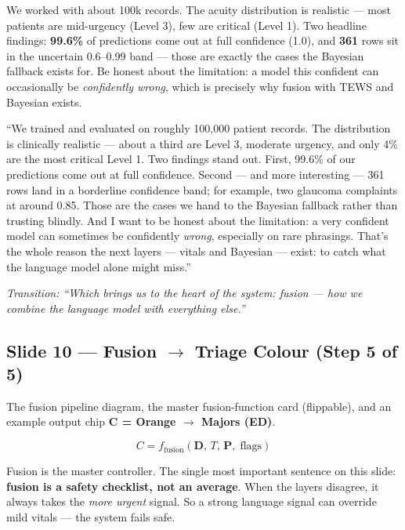 \documentclass[11pt]{article}
\newcommand{\chip}[2]{\textcolor{#1}{\textbf{#2}}}
\newcommand{\transition}[1]{\medskip\noindent\textit{\textcolor{mutel}{Transition: #1}}\medskip}
\newcommand{\route}[1]{{\small\texttt{\textcolor{mutel}{#1}}}}
\newcommand{\slide}[3]{%
  \subsection{Slide #1 --- #2}%
  \noindent\route{Route: #3}\par\smallskip}
\begin{document}
\begin{idea}
We worked with about 100k records. The acuity distribution is realistic --- most patients are
mid-urgency (Level 3), few are critical (Level 1). Two headline findings: \textbf{99.6\%} of predictions
come out at full confidence (1.0), and \textbf{361} rows sit in the uncertain 0.6--0.99 band --- those are
exactly the cases the Bayesian fallback exists for. Be honest about the limitation: a model this confident
can occasionally be \emph{confidently wrong}, which is precisely why fusion with TEWS and Bayesian exists.
\end{idea}

\begin{saybox}
``We trained and evaluated on roughly 100,000 patient records. The distribution is clinically realistic
--- about a third are Level 3, moderate urgency, and only 4\% are the most critical Level 1. Two findings
stand out. First, 99.6\% of our predictions come out at full confidence. Second --- and more interesting
--- 361 rows land in a borderline confidence band; for example, two glaucoma complaints at around 0.85.
Those are the cases we hand to the Bayesian fallback rather than trusting blindly. And I want to be honest
about the limitation: a very confident model can sometimes be confidently \emph{wrong}, especially on
rare phrasings. That's the whole reason the next layers --- vitals and Bayesian --- exist: to catch what
the language model alone might miss.''
\end{saybox}

\transition{``Which brings us to the heart of the system: fusion --- how we combine the language model with everything else.''}

\slide{10}{Fusion $\rightarrow$ Triage Colour (Step 5 of 5)}{/dashboard/pipeline/fusion}

\begin{onscreen}
The fusion pipeline diagram, the master fusion-function card (flippable), and an example output chip
\chip{satOrange}{C = Orange $\rightarrow$ Majors (ED)}.
\end{onscreen}

\[
C = f_{\mathrm{fusion}}(\mathbf{D},\, T,\, \mathbf{P},\; \text{flags})
\]

\begin{idea}
Fusion is the master controller. The single most important sentence on this slide: \textbf{fusion is a
safety checklist, not an average}. When the layers disagree, it always takes the \emph{more urgent}
signal. So a strong language signal can override mild vitals --- the system fails safe.
\end{idea}
\end{document}
